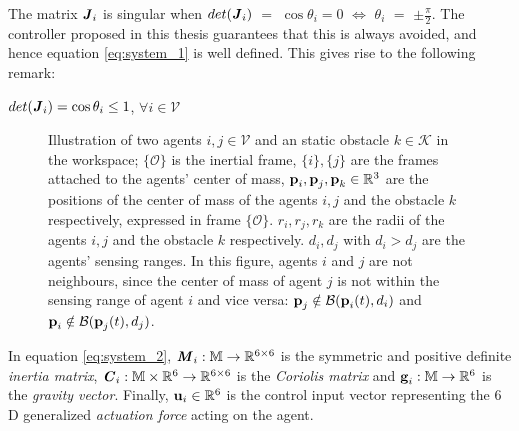 The matrix $\bm{\mathit{J}}_i$ is singular when $det(\bm{\mathit{J}}_i)$ $=$ $\cos\theta_i = 0$
$\Leftrightarrow$ $\theta_i$ $=$ $\pm \frac{\pi}{2}$. The controller
proposed in this thesis guarantees that this is always avoided, and hence
equation \eqref{eq:system_1} is well defined. This gives rise to the following
remark:

\begin{bw_box}
  \begin{remark}
    $det(\bm{\mathit{J}}_i) = \cos\theta_i \leq 1$, $\forall i \in \mathcal{V}$
  \end{remark}
\end{bw_box}

\begin{figure}[ht!]
	\centering
    
    \caption{Illustration of two agents $i, j \in \mathcal{V}$ and an static
      obstacle $k \in \mathcal{K}$ in the workspace; $\{\mathcal{O}\}$ is the inertial
      frame, $\{i\}, \{j\}$ are the frames attached to the agents' center of
      mass, $\bm{\mathbf{p}}_i, \bm{\mathbf{p}}_j, \bm{\mathbf{p}}_{k} \in \mathbb{R}^3$ are the
      positions of the center of mass of the agents $i,j$ and the
      obstacle $k$ respectively, expressed in frame
      $\{\mathcal{O}\}$. $r_i, r_j, r_{k}$ are the radii of the agents $i,j$
      and the obstacle $k$ respectively. $d_i, d_j$ with
      $d_i > d_j$ are the agents' sensing ranges.
      In this figure, agents $i$ and $j$ are not neighbours, since the center
      of mass of agent $j$ is not within the sensing range of agent $i$ and vice
      versa: $\bm{\mathbf{p}}_j \notin \mathcal{B}(\bm{\mathbf{p}}_i(t), d_i)$ and
      $\bm{\mathbf{p}}_i \notin \mathcal{B}(\bm{\mathbf{p}}_j(t), d_j)$.}
	\label{fig:two_agents_one_obstacle}
\end{figure}

In equation \eqref{eq:system_2}, $\bm{\mathit{M}}_i:\mathbb{M} \to \mathbb{R}^{6\times6}$ is
the symmetric and positive definite \textit{inertia matrix},
$\bm{\mathit{C}}_i:\mathbb{M}\times\mathbb{R}^6 \to \mathbb{R}^{6\times6}$ is the
\textit{Coriolis matrix} and $\bm{\mathbf{g}}_i:\mathbb{M} \to \mathbb{R}^6$ is the
\textit{gravity vector}.
Finally, $\bm{\mathbf{u}}_i\in\mathbb{R}^6$ is the control input vector representing
the $6$D generalized \textit{actuation force} acting on the agent.



